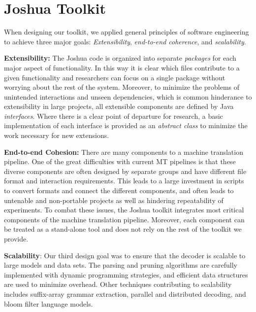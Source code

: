 \documentclass[11pt]{article}
\begin{document}

\section{Joshua Toolkit}
When designing our toolkit, we applied general principles of software engineering to achieve three major goals: \emph{Extensibility}, \emph{end-to-end coherence}, and \emph{scalability}.

\textbf{Extensibility:} The Joshua code is organized into separate \emph{packages} for each major aspect of functionality. In this way it is clear which files contribute to a given functionality and researchers can focus on a single package without worrying about the rest of the system. Moreover, to minimize the problems of unintended interactions and unseen dependencies, which is common hinderance to extensibility in large projects, all extensible components are defined by Java \emph{interfaces}. Where there is a clear point of departure for research, a basic implementation of each interface is provided as an \emph{abstract class} to minimize the work necessary for new extensions.

\textbf{End-to-end Cohesion:} There are many components to a machine translation pipeline. One of the great difficulties with current MT pipelines is that these diverse components are often designed by separate groups and have different file format and interaction requirements. This leads to a large investment in scripts to convert formats and connect the different components, and often leads to untenable and non-portable projects as well as hindering repeatability of experiments.
To combat these issues, the Joshua toolkit integrates most critical components of the machine translation pipeline. Moreover, each component can be treated as a stand-alone tool and does not rely on the rest of the toolkit we provide.

\textbf{Scalability}: Our third design goal was to ensure that the decoder is scalable to large models and data sets. The parsing and pruning algorithms are carefully implemented with dynamic programming strategies, and efficient data structures are used to minimize overhead. Other techniques contributing to scalability includes suffix-array grammar extraction, parallel and distributed decoding, and bloom filter language models.
\end{document}
